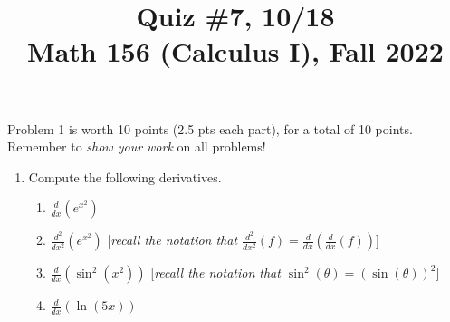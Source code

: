 \documentclass[11pt]{article}
\title{Quiz \#7, 10/18 \\ Math 156 (Calculus I), Fall 2022}
\date{}
\begin{document}
\maketitle

\thispagestyle{empty}

\vspace{-1cm}

Problem 1 is worth 10 points (2.5 pts each part), for a total of 10 points. Remember to \emph{show your work} on all problems!

\begin{enumerate}
\item Compute the following derivatives.
\begin{enumerate}
\item $\displaystyle \frac{d}{dx} ( e^{x^2})$
\item $\displaystyle \frac{d^2}{dx^2} (e^{x^2}) $ \hfill [\emph{recall the notation that $\frac{d^2}{dx^2} ( f) = \frac{d}{dx} ( \frac{d}{dx}(f))$}]
\item $\displaystyle \frac{d}{dx} ( \sin^2(x^2) ) $ \hfill [\emph{recall the notation that $\sin^2(\theta)= (\sin(\theta))^2$}]
\item $\displaystyle \frac{d}{dx} ( \ln(5x) )$
\end{enumerate}
\end{enumerate}
\end{document}
